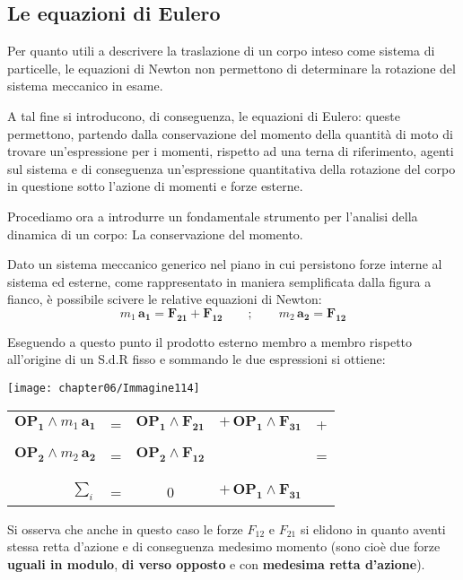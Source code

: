 		\subsection{Le equazioni di Eulero}
	
		Per quanto utili a descrivere la traslazione di un corpo inteso come sistema di particelle, le equazioni di Newton non permettono di determinare la rotazione del sistema meccanico in esame.
		
		A tal fine si introducono, di conseguenza, le equazioni di Eulero: queste permettono, partendo dalla conservazione del momento della quantità di moto di trovare un'espressione per i momenti, rispetto ad una terna di riferimento, agenti sul sistema e di conseguenza un'espressione quantitativa della rotazione del corpo in questione sotto l'azione di momenti e forze esterne.
		
Procediamo ora a introdurre un fondamentale strumento per l'analisi della dinamica di un corpo: La conservazione del momento.

\begin{minipage}{.5\textwidth}
Dato un sistema meccanico generico nel piano in cui persistono forze interne al sistema ed esterne, come rappresentato in maniera semplificata dalla figura a fianco, è possibile scivere le relative equazioni di Newton:
\[m_1\,\mathbf{a_1} = \mathbf{F_{21}} + \mathbf{F_{12}}\qquad;\qquad m_2\,\mathbf{a_2} = \mathbf{F_{12}}\]

Eseguendo a questo punto il prodotto esterno membro a membro rispetto all'origine di un S.d.R fisso e sommando le due espressioni si ottiene:
\end{minipage}
\hfill
\begin{minipage}{.5\textwidth}
\centering
\texttt{[image: chapter06/Immagine114]}
\end{minipage}

\begin{minipage}{.5\textwidth}
\begin{tabular}{rcclc}
$\mathbf{OP_1}\wedge m_1\,\mathbf{a_1}$ &=& $\mathbf{OP_1} \wedge \mathbf{F_{21}}$ &$+\, \mathbf{OP_1}\wedge \mathbf{F_{31}}$&+\\
&&&&\\
$\mathbf{OP_2}\wedge m_2\,\mathbf{a_2}$ &=&$\mathbf{OP_2} \wedge \mathbf{F_{12}}$&&=\\
&&&&\\
\midrule
&&&&\\
$\sum_i$&=&0&$+\, \mathbf{OP_1}\wedge \mathbf{F_{31}}$&
\end{tabular}
\end{minipage}
\hfill
\begin{minipage}{.5\textwidth}
Si osserva che anche in questo caso le forze $F_{12}$ e $F_{21}$ si elidono in quanto aventi stessa retta d'azione e di conseguenza medesimo momento (sono cioè due forze \textbf{uguali in modulo}, \textbf{di verso opposto} e con \textbf{medesima retta d'azione}).
\end{minipage}
\vspace{1mm}


